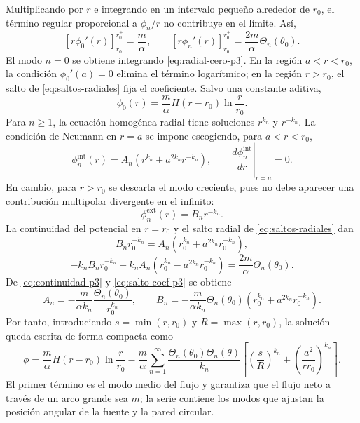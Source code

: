 \documentclass[11pt]{article}
\begin{document}
Multiplicando por $r$ e integrando en un intervalo pequeño alrededor de $r_0$, el término regular proporcional a $\phi_n/r$ no contribuye en el límite. Así,
\begin{equation}
\left[r\phi_0'(r)\right]_{r_0^-}^{r_0^+}=\frac{m}{\alpha},
\qquad
\left[r\phi_n'(r)\right]_{r_0^-}^{r_0^+}=\frac{2m}{\alpha}\Theta_n(\theta_0).
\label{eq:saltos-radiales}
\end{equation}
El modo $n=0$ se obtiene integrando \eqref{eq:radial-cero-p3}. En la región $a<r<r_0$, la condición $\phi_0'(a)=0$ elimina el término logarítmico; en la región $r>r_0$, el salto de \eqref{eq:saltos-radiales} fija el coeficiente. Salvo una constante aditiva,
\begin{equation}
\phi_0(r)=\frac{m}{\alpha}H(r-r_0)\ln\frac{r}{r_0}.
\label{eq:modo-cero-p3}
\end{equation}
Para $n\ge1$, la ecuación homogénea radial tiene soluciones $r^{k_n}$ y $r^{-k_n}$. La condición de Neumann en $r=a$ se impone escogiendo, para $a<r<r_0$,
\begin{equation}
\phi_n^{\mathrm{int}}(r)=A_n\left(r^{k_n}+a^{2k_n}r^{-k_n}\right),
\qquad
\left.\frac{d\phi_n^{\mathrm{int}}}{dr}\right|_{r=a}=0.
\label{eq:radial-interna-p3}
\end{equation}
En cambio, para $r>r_0$ se descarta el modo creciente, pues no debe aparecer una contribución multipolar divergente en el infinito:
\begin{equation}
\phi_n^{\mathrm{ext}}(r)=B_n r^{-k_n}.
\label{eq:radial-externa-p3}
\end{equation}
La continuidad del potencial en $r=r_0$ y el salto radial de \eqref{eq:saltos-radiales} dan
\begin{equation}
B_n r_0^{-k_n}=A_n\left(r_0^{k_n}+a^{2k_n}r_0^{-k_n}\right),
\label{eq:continuidad-p3}
\end{equation}
\begin{equation}
-k_nB_n r_0^{-k_n}-k_nA_n\left(r_0^{k_n}-a^{2k_n}r_0^{-k_n}\right)
=\frac{2m}{\alpha}\Theta_n(\theta_0).
\label{eq:salto-coef-p3}
\end{equation}
De \eqref{eq:continuidad-p3} y \eqref{eq:salto-coef-p3} se obtiene
\begin{equation}
A_n=-\frac{m}{\alpha k_n}\frac{\Theta_n(\theta_0)}{r_0^{k_n}},
\qquad
B_n=-\frac{m}{\alpha k_n}\Theta_n(\theta_0)
\left(r_0^{k_n}+a^{2k_n}r_0^{-k_n}\right).
\label{eq:coeficientes-radiales-p3}
\end{equation}
Por tanto, introduciendo $s=\min(r,r_0)$ y $R=\max(r,r_0)$, la solución queda escrita de forma compacta como
\begin{equation}
\phi=\frac{m}{\alpha}H(r-r_0)\ln\frac{r}{r_0}
-\frac{m}{\alpha}\sum_{n=1}^{\infty}\frac{\Theta_n(\theta_0)\Theta_n(\theta)}{k_n}
\left[
\left(\frac{s}{R}\right)^{k_n}
+\left(\frac{a^2}{rr_0}\right)^{k_n}
\right].
\label{eq:phi-separacion}
\end{equation}
El primer término es el modo medio del flujo y garantiza que el flujo neto a través de un arco grande sea $m$; la serie contiene los modos que ajustan la posición angular de la fuente y la pared circular.
\end{document}
